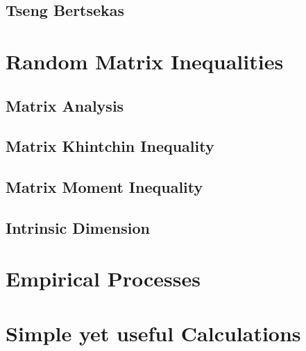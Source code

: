 \documentclass[12pt]{scrreport}
\begin{document}
  \section{Tseng Bertsekas}
  
\chapter{Random Matrix Inequalities}

  \section{Matrix Analysis}
  
 \section{Matrix Khintchin Inequality}
  
%
  \section{Matrix Moment Inequality}
    
  
  \section{Intrinsic Dimension}
  


\chapter{Empirical Processes}


\chapter{Simple yet useful Calculations} 



\printnomenclature

{}

\end{document}
